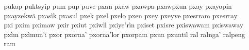 \documentclass[a4paper]{article}
\begin{document}
pukap\hspace{2mm}
puktsyìp\hspace{2mm}
pum\hspace{2mm}
pup\hspace{2mm}
puve\hspace{2mm}
pxan\hspace{2mm}
pxaw\hspace{2mm}
pxawpa\hspace{2mm}
pxawpxun\hspace{2mm}
pxay\hspace{2mm}
pxayopin\hspace{2mm}
pxayzekwä\hspace{2mm}
pxasìk\hspace{2mm}
pxasul\hspace{2mm}
pxek\hspace{2mm}
pxel\hspace{2mm}
pxelo\hspace{2mm}
pxen\hspace{2mm}
pxey\hspace{2mm}
pxeyve\hspace{2mm}
pxesrram\hspace{2mm}
pxesrray\hspace{2mm}
pxi\hspace{2mm}
pxim\hspace{2mm}
pximaw\hspace{2mm}
pxir\hspace{2mm}
pxiut\hspace{2mm}
pxiwll\hspace{2mm}
pxiye'rìn\hspace{2mm}
pxiset\hspace{2mm}
pxisre\hspace{2mm}
pxiswawam\hspace{2mm}
pxiswaway\hspace{2mm}
pxìm\hspace{2mm}
pxìmun'i\hspace{2mm}
pxor\hspace{2mm}
pxorna'\hspace{2mm}
pxorna'lor\hspace{2mm}
pxorpam\hspace{2mm}
pxun\hspace{2mm}
pxuntil\hspace{2mm}
ral\hspace{2mm}
ralnga'\hspace{2mm}
ralpeng\hspace{2mm}
ram\hspace{2mm}
\end{document}
